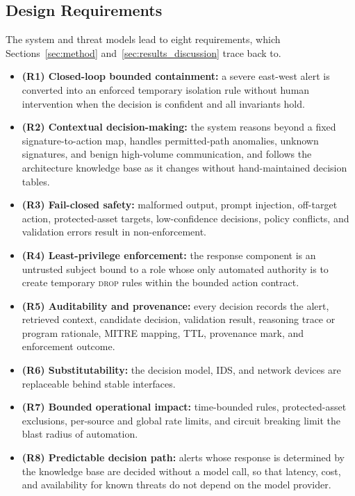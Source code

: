 \documentclass[final,5p]{elsarticle}
\begin{document}
\subsection{Design Requirements}
\label{sec:requirements}

The system and threat models lead to eight requirements, which Sections~\ref{sec:method} and~\ref{sec:results_discussion} trace back to.
\begin{itemize}[leftmargin=*]
    \item \textbf{(R1) Closed-loop bounded containment:} a severe east-west alert is converted into an enforced temporary isolation rule without human intervention when the decision is confident and all invariants hold.
    \item \textbf{(R2) Contextual decision-making:} the system reasons beyond a fixed signature-to-action map, handles permitted-path anomalies, unknown signatures, and benign high-volume communication, and follows the architecture knowledge base as it changes without hand-maintained decision tables.
    \item \textbf{(R3) Fail-closed safety:} malformed output, prompt injection, off-target action, protected-asset targets, low-confidence decisions, policy conflicts, and validation errors result in non-enforcement.
    \item \textbf{(R4) Least-privilege enforcement:} the response component is an untrusted subject bound to a role whose only automated authority is to create temporary \textsc{drop} rules within the bounded action contract.
    \item \textbf{(R5) Auditability and provenance:} every decision records the alert, retrieved context, candidate decision, validation result, reasoning trace or program rationale, MITRE mapping, TTL, provenance mark, and enforcement outcome.
    \item \textbf{(R6) Substitutability:} the decision model, IDS, and network devices are replaceable behind stable interfaces.
    \item \textbf{(R7) Bounded operational impact:} time-bounded rules, protected-asset exclusions, per-source and global rate limits, and circuit breaking limit the blast radius of automation.
    \item \textbf{(R8) Predictable decision path:} alerts whose response is determined by the knowledge base are decided without a model call, so that latency, cost, and availability for known threats do not depend on the model provider.
\end{itemize}
\end{document}
